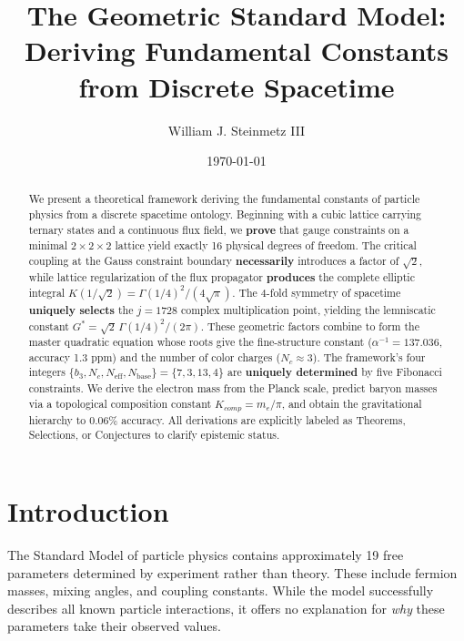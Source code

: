 \documentclass[aps,prd,twocolumn,10pt,groupedaddress,superscriptaddress]{revtex4-2}
\begin{document}
\title{The Geometric Standard Model: Deriving Fundamental Constants from Discrete Spacetime}
\author{William J. Steinmetz III}
\date{\today}

\begin{abstract}
We present a theoretical framework deriving the fundamental constants of particle physics from a discrete spacetime ontology. Beginning with a cubic lattice carrying ternary states and a continuous flux field, we \textbf{prove} that gauge constraints on a minimal $2\times2\times2$ lattice yield exactly 16 physical degrees of freedom. The critical coupling at the Gauss constraint boundary \textbf{necessarily} introduces a factor of $\sqrt{2}$, while lattice regularization of the flux propagator \textbf{produces} the complete elliptic integral $K(1/\sqrt{2}) = \Gamma(1/4)^2/(4\sqrt{\pi})$. The 4-fold symmetry of spacetime \textbf{uniquely selects} the $j=1728$ complex multiplication point, yielding the lemniscatic constant $G^* = \sqrt{2}\,\Gamma(1/4)^2/(2\pi)$. These geometric factors combine to form the master quadratic equation whose roots give the fine-structure constant ($\alpha^{-1} = 137.036$, accuracy 1.3 ppm) and the number of color charges ($N_c \approx 3$). The framework's four integers $\{b_3, N_c, N_{\text{eff}}, N_{\text{base}}\} = \{7, 3, 13, 4\}$ are \textbf{uniquely determined} by five Fibonacci constraints. We derive the electron mass from the Planck scale, predict baryon masses via a topological composition constant $K_{comp} = m_e/\pi$, and obtain the gravitational hierarchy to 0.06\% accuracy. All derivations are explicitly labeled as Theorems, Selections, or Conjectures to clarify epistemic status.
\end{abstract}

\maketitle

\section{Introduction}

The Standard Model of particle physics contains approximately 19 free parameters determined by experiment rather than theory. These include fermion masses, mixing angles, and coupling constants. While the model successfully describes all known particle interactions, it offers no explanation for \textit{why} these parameters take their observed values.
\end{document}
